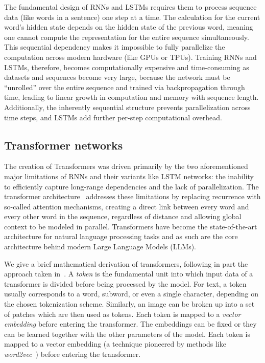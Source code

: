 The fundamental design of RNNs and LSTMs requires them to process sequence data (like words in a sentence) one step at a time. The calculation for the current word's hidden state depends on the hidden state of the previous word,  meaning one cannot compute the representation for the entire sequence simultaneously. This sequential dependency makes it impossible to fully parallelize the computation across modern hardware (like GPUs or TPUs). Training RNNs and LSTMs, therefore, becomes computationally expensive and time-consuming as datasets and sequences become very large,
because the network must be ``unrolled'' over the entire sequence and trained via backpropagation through time, leading to linear growth in computation and memory with sequence length. Additionally, the inherently sequential structure prevents parallelization across time steps, and LSTMs add further per-step computational overhead.


\subsection{Transformer networks}

The creation of Transformers was driven primarily by the two aforementioned major limitations of RNNs and their variants like LSTM networks: the inability to efficiently capture long-range dependencies and the lack of parallelization. The transformer architecture~\cite{vaswani2017attention} addresses these limitations by replacing recurrence with so-called attention mechanisms, creating a direct link between every word and every other word in the sequence, regardless of distance and allowing global context to be modeled in parallel. Transformers  have become the state-of-the-art architecture for natural language processing tasks and as such are the core architecture behind modern Large Language Models (LLMs). 



We give a brief mathematical derivation of transformers, following in part the approach taken in~\cite{turner2023introduction}. A {\em token} is the fundamental unit into which input data of a transformer is divided before being processed by the model.
For text, a token usually corresponds to a word, subword, or even a single character, depending on the chosen tokenization scheme. Similarly,  an image can be broken up into a set of patches which are then used as tokens.
Each token is mapped to a {\em vector embedding} before entering the transformer. The embeddings can be fixed or they can be learned together with the other parameters of the model.
Each token is mapped to a vector embedding (a technique pioneered by methods like {\em word2vec}~\cite{mikolov2013efficient}) before entering the transformer.


